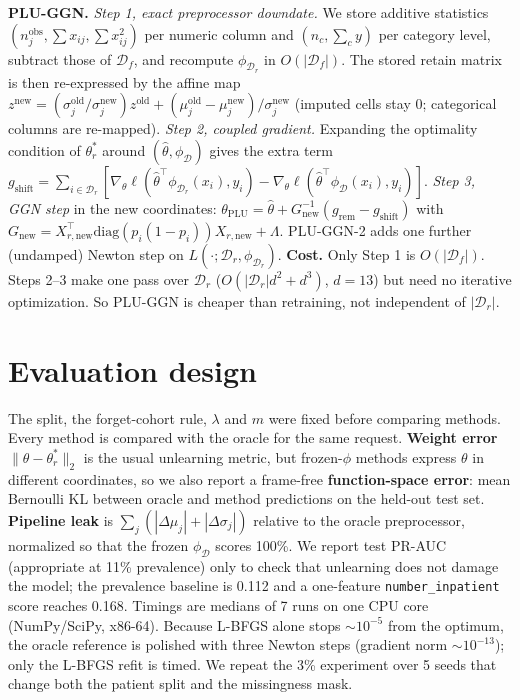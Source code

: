 \documentclass{article}
\newcommand{\Df}{\mathcal{D}_f}
\newcommand{\Dr}{\mathcal{D}_r}
\newcommand{\D}{\mathcal{D}}
\begin{document}
\textbf{PLU-GGN.} \emph{Step 1, exact preprocessor downdate.} We store additive statistics
$(n^{\mathrm{obs}}_j,\sum x_{ij},\sum x_{ij}^2)$ per numeric column and $(n_c,\sum_{c}y)$ per
category level, subtract those of $\Df$, and recompute $\phi_{\Dr}$ in $O(|\Df|)$. The stored retain
matrix is then re-expressed by the affine map $z^{\mathrm{new}}=(\sigma^{\mathrm{old}}_j/\sigma^{\mathrm{new}}_j)z^{\mathrm{old}}
+(\mu^{\mathrm{old}}_j-\mu^{\mathrm{new}}_j)/\sigma^{\mathrm{new}}_j$ (imputed cells stay 0; categorical
columns are re-mapped). \emph{Step 2, coupled gradient.} Expanding the optimality condition of
$\theta_r^*$ around $(\hat\theta,\phi_\D)$ gives the extra term
$g_{\mathrm{shift}}=\sum_{i\in\Dr}[\nabla_\theta\ell(\hat\theta^\top\phi_{\Dr}(x_i),y_i)-\nabla_\theta\ell(\hat\theta^\top\phi_\D(x_i),y_i)]$.
\emph{Step 3, GGN step} in the new coordinates:
$\theta_{\mathrm{PLU}}=\hat\theta+G_{\mathrm{new}}^{-1}(g_{\mathrm{rem}}-g_{\mathrm{shift}})$ with
$G_{\mathrm{new}}=X_{r,\mathrm{new}}^\top\mathrm{diag}(p_i(1-p_i))X_{r,\mathrm{new}}+\Lambda$.
PLU-GGN-2 adds one further (undamped) Newton step on $L(\cdot;\Dr,\phi_{\Dr})$.
\textbf{Cost.} Only Step 1 is $O(|\Df|)$. Steps 2--3 make one pass over $\Dr$ ($O(|\Dr|d^2+d^3)$, $d=13$)
but need no iterative optimization. So PLU-GGN is cheaper than retraining, not independent of $|\Dr|$.

\section{Evaluation design}
\label{sec:eval}
The split, the forget-cohort rule, $\lambda$ and $m$ were fixed before comparing methods. Every method
is compared with the oracle for the same request. \textbf{Weight error} $\|\theta-\theta_r^*\|_2$ is
the usual unlearning metric, but frozen-$\phi$ methods express $\theta$ in different coordinates, so
we also report a frame-free \textbf{function-space error}: mean Bernoulli KL between oracle and method
predictions on the held-out test set. \textbf{Pipeline leak} is
$\sum_j(|\Delta\mu_j|+|\Delta\sigma_j|)$ relative to the oracle preprocessor, normalized so that the
frozen $\phi_\D$ scores 100\%. We report test PR-AUC (appropriate at 11\% prevalence) only to check
that unlearning does not damage the model; the prevalence baseline is 0.112 and a one-feature
\texttt{number\_inpatient} score reaches 0.168. Timings are medians of 7 runs on one CPU core
(NumPy/SciPy, x86-64). Because L-BFGS alone stops $\sim\!10^{-5}$ from the optimum, the oracle
reference is polished with three Newton steps (gradient norm $\sim\!10^{-13}$); only the L-BFGS refit is timed. We repeat the 3\% experiment over 5 seeds that change both the patient split
and the missingness mask.
\end{document}
